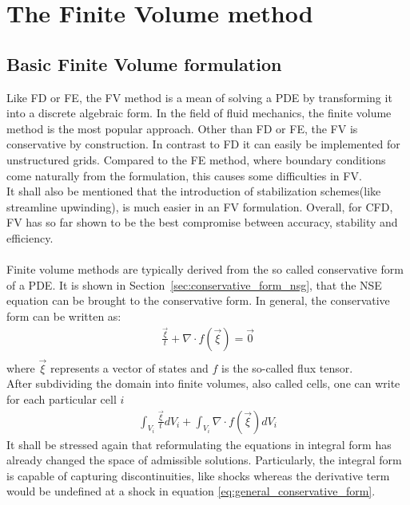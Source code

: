 \documentclass[../main.tex]{subfiles}
\begin{document}
\setlength{\delimitershortfall}{0pt}


\chapter{The Finite Volume method}\label{sec:finite_volume_method}
\minitoc

\section{Basic Finite Volume formulation}\label{sec:basic_fv}
Like \ac{FD} or \acf{FE}, the \acf{FV} method is a mean of solving a \ac{PDE} by transforming it into a discrete algebraic form. In the field of fluid mechanics, the finite volume method is the most popular approach. Other than \ac{FD} or \ac{FE}, the \ac{FV} is conservative by construction. In contrast to \ac{FD} it can easily be implemented for unstructured grids. Compared to the \ac{FE} method, where boundary conditions come naturally from the formulation, this causes some difficulties in \ac{FV}.\\
It shall also be mentioned that the introduction of stabilization schemes(like streamline upwinding), is much easier in an \ac{FV} formulation.
Overall, for \ac{CFD}, \ac{FV} has so far shown to be the best compromise between accuracy, stability and efficiency.
 \\
 \\
Finite volume methods are typically derived from the so called conservative form of a \ac{PDE}. It is shown in Section~\ref{sec:conservative_form_nsg}, that the \ac{NSE} equation can be  brought to the conservative form. In general, the conservative form can be written as:
\begin{align}\label{eq:general_conservative_form}
\tfrac{\vec{\xi}}{t}+\nabla\cdot f(\vec{\xi}) = \vec{0} \\
\end{align}
where $\vec{\xi}$ represents a vector of states and $f$ is the so-called flux tensor.\\
After subdividing the domain into finite volumes, also called cells, one can write for each particular cell $i$
\begin{align}
\int_{V_i} \tfrac{\vec{\xi}}{t} dV_i + \int_{V_i} \nabla\cdot f(\vec{\xi}) dV_i
\end{align}
It shall be stressed again that reformulating the equations in integral form has already changed the space of admissible solutions. Particularly, the integral form is capable of capturing discontinuities, like shocks whereas the derivative term would be undefined  at a shock in equation \eqref{eq:general_conservative_form}.
\end{document}
